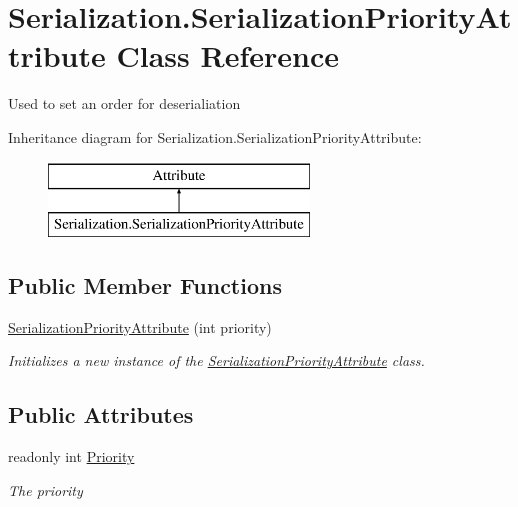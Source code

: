 \hypertarget{class_serialization_1_1_serialization_priority_attribute}{}\section{Serialization.\+Serialization\+Priority\+Attribute Class Reference}
\label{class_serialization_1_1_serialization_priority_attribute}


Used to set an order for deserialiation  


Inheritance diagram for Serialization.\+Serialization\+Priority\+Attribute\+:\begin{figure}[H]
\begin{center}
\leavevmode
\includegraphics[height=2.000000cm]{class_serialization_1_1_serialization_priority_attribute}
\end{center}
\end{figure}
\subsection*{Public Member Functions}
\begin{DoxyCompactItemize}
\item 
\hyperlink{class_serialization_1_1_serialization_priority_attribute_a0c3f47a8c3fe6ec68a4e9804eef75f61}{Serialization\+Priority\+Attribute} (int priority)
\begin{DoxyCompactList}\small\item\em Initializes a new instance of the \hyperlink{class_serialization_1_1_serialization_priority_attribute}{Serialization\+Priority\+Attribute} class. \end{DoxyCompactList}\end{DoxyCompactItemize}
\subsection*{Public Attributes}
\begin{DoxyCompactItemize}
\item 
readonly int \hyperlink{class_serialization_1_1_serialization_priority_attribute_ac1837f6eb321efa34ffed0a92f3fc89e}{Priority}
\begin{DoxyCompactList}\small\item\em The priority \end{DoxyCompactList}\end{DoxyCompactItemize}


